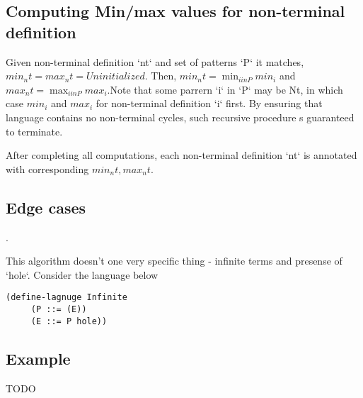 \subsection{Computing Min/max values for non-terminal definition}

Given non-terminal definition `nt` and set of patterns `P` it matches, $min_nt = max_nt = Uninitialized$. Then, $min_nt = \min_{i in P} min_i$ and $max_nt = \max_{i in P} max_i$.Note that some parrern `i` in `P` may be Nt, in which case $min_i$ and $max_i$ for non-terminal definition `i` first. By ensuring that language contains no non-terminal cycles, such recursive procedure s guaranteed to terminate.

After completing all computations, each non-terminal definition `nt` is annotated with corresponding $min_nt, max_nt$.


\subsection{Edge cases}.

This algorithm doesn't one very specific thing - infinite terms and presense of `hole`. Consider the language below

\begin{lstlisting}
(define-lagnuge Infinite
     (P ::= (E))      
     (E ::= P hole))
\end{lstlisting}

\subsection{Example}
TODO
